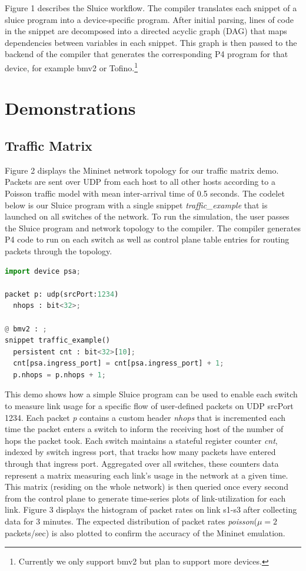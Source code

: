 Figure 1 describes the Sluice workflow. The compiler translates each snippet of
a sluice program into a device-specific program. After initial parsing, lines
of code in the snippet are decomposed into a directed acyclic graph (DAG) that
maps dependencies between variables in each snippet. This graph is then passed
to the backend of the compiler that generates the corresponding P4 program for
that device, for example bmv2 or Tofino.\footnote{Currently we only support
bmv2 but plan to support more devices.} 


\section{Demonstrations}
 
\subsection{Traffic Matrix}

Figure 2 displays the Mininet network topology for our traffic matrix demo.
Packets are sent over UDP from each host to all other hosts according to a
Poisson traffic model with mean inter-arrival time of 0.5 seconds. The codelet
below is our Sluice program with a single snippet \textit{traffic\_example}
that is launched on all switches of the network. To run the simulation, the
user passes the Sluice program and network topology to the compiler. The
compiler generates P4 code to run on each switch as well as control plane table
entries for routing packets through the topology.

\begin{lstlisting}[language=Python, basicstyle=\scriptsize]
import device psa;

packet p: udp(srcPort:1234)
  nhops : bit<32>;

@ bmv2 : ;
snippet traffic_example()
  persistent cnt : bit<32>[10];
  cnt[psa.ingress_port] = cnt[psa.ingress_port] + 1;
  p.nhops = p.nhops + 1;
\end{lstlisting}

This demo shows how a simple Sluice program can be used to enable each switch
to measure link usage for a specific flow of user-defined packets on UDP
srcPort 1234. Each packet \textit{p} contains a custom header \textit{nhops}
that is incremented each time the packet enters a switch to inform the
receiving host of the number of hops the packet took. Each switch maintains a
stateful register counter \textit{cnt}, indexed by switch ingress port, that
tracks how many packets have entered through that ingress port. Aggregated over
all switches, these counters data represent a matrix measuring each link's
usage in the network at a given time. This matrix (residing on the whole
network) is then queried once every second from the control plane to generate
time-series plots of link-utilization for each link. Figure 3 displays the
histogram of packet rates on link s1-s3 after collecting data for 3 minutes.
The expected distribution of packet rates \textit{poisson}($\mu = 2$
packets/sec) is also plotted to confirm the accuracy of the Mininet emulation.

